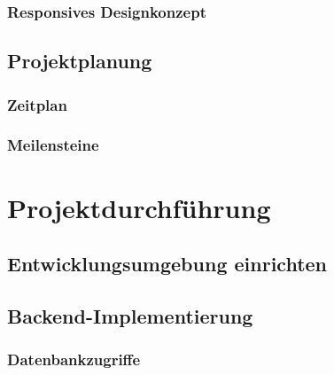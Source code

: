 \documentclass[11pt,a4paper]{article}
\begin{document}
\subsubsection{Responsives Designkonzept}

\subsection{Projektplanung}

\subsubsection{Zeitplan}

\subsubsection{Meilensteine}

\newpage
\section{Projektdurchführung}

\subsection{Entwicklungsumgebung einrichten}

\subsection{Backend-Implementierung}

\subsubsection{Datenbankzugriffe}
\end{document}
